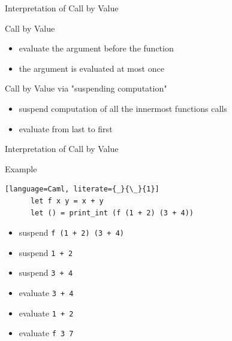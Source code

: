 \documentclass[10pt]{beamer}
\begin{document}
\begin{frame}[fragile]{Interpretation of Call by Value}
  \begin{alertblock}{Call by Value}
    \begin{itemize}
      \item evaluate the argument before the function
      \item the argument is evaluated at most once
    \end{itemize}
  \end{alertblock}

  \pause

  \begin{alertblock}{Call by Value via "suspending computation"}
    \begin{itemize}
      \item suspend computation of all the innermost functions calls
      \item evaluate from last to first
    \end{itemize}
  \end{alertblock}

\end{frame}

  \begin{frame}[fragile]{Interpretation of Call by Value}

  \begin{alertblock}{Example}
    \begin{lstlisting}[language=Caml, literate={_}{\_}{1}]
      let f x y = x + y
      let () = print_int (f (1 + 2) (3 + 4))

    \end{lstlisting}

    \pause

    \begin{itemize} [<+- | alert@+>]
      \item suspend \texttt{f (1 + 2) (3 + 4)}
      \item suspend \texttt{1 + 2}
      \item suspend \texttt{3 + 4}
      \item evaluate \texttt{3 + 4}
      \item evaluate \texttt{1 + 2}
      \item evaluate \texttt{f 3 7}
    \end{itemize}
  \end{alertblock}
\end{frame}
\end{document}
